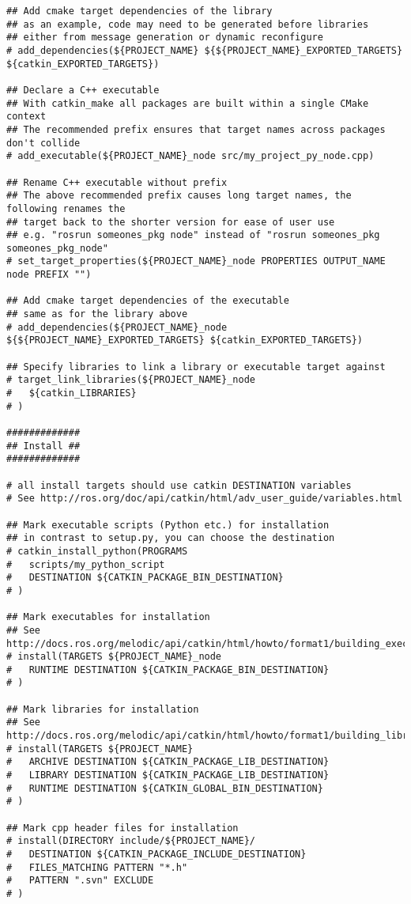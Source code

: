 \documentclass[letterpaper]{article}
\begin{document}
\begin{lstlisting}[style=mystyle, title=src/my\_project\_py/CMakeLists.txt]
## Add cmake target dependencies of the library
## as an example, code may need to be generated before libraries
## either from message generation or dynamic reconfigure
# add_dependencies(${PROJECT_NAME} ${${PROJECT_NAME}_EXPORTED_TARGETS} ${catkin_EXPORTED_TARGETS})

## Declare a C++ executable
## With catkin_make all packages are built within a single CMake context
## The recommended prefix ensures that target names across packages don't collide
# add_executable(${PROJECT_NAME}_node src/my_project_py_node.cpp)

## Rename C++ executable without prefix
## The above recommended prefix causes long target names, the following renames the
## target back to the shorter version for ease of user use
## e.g. "rosrun someones_pkg node" instead of "rosrun someones_pkg someones_pkg_node"
# set_target_properties(${PROJECT_NAME}_node PROPERTIES OUTPUT_NAME node PREFIX "")

## Add cmake target dependencies of the executable
## same as for the library above
# add_dependencies(${PROJECT_NAME}_node ${${PROJECT_NAME}_EXPORTED_TARGETS} ${catkin_EXPORTED_TARGETS})

## Specify libraries to link a library or executable target against
# target_link_libraries(${PROJECT_NAME}_node
#   ${catkin_LIBRARIES}
# )

#############
## Install ##
#############

# all install targets should use catkin DESTINATION variables
# See http://ros.org/doc/api/catkin/html/adv_user_guide/variables.html

## Mark executable scripts (Python etc.) for installation
## in contrast to setup.py, you can choose the destination
# catkin_install_python(PROGRAMS
#   scripts/my_python_script
#   DESTINATION ${CATKIN_PACKAGE_BIN_DESTINATION}
# )

## Mark executables for installation
## See http://docs.ros.org/melodic/api/catkin/html/howto/format1/building_executables.html
# install(TARGETS ${PROJECT_NAME}_node
#   RUNTIME DESTINATION ${CATKIN_PACKAGE_BIN_DESTINATION}
# )

## Mark libraries for installation
## See http://docs.ros.org/melodic/api/catkin/html/howto/format1/building_libraries.html
# install(TARGETS ${PROJECT_NAME}
#   ARCHIVE DESTINATION ${CATKIN_PACKAGE_LIB_DESTINATION}
#   LIBRARY DESTINATION ${CATKIN_PACKAGE_LIB_DESTINATION}
#   RUNTIME DESTINATION ${CATKIN_GLOBAL_BIN_DESTINATION}
# )

## Mark cpp header files for installation
# install(DIRECTORY include/${PROJECT_NAME}/
#   DESTINATION ${CATKIN_PACKAGE_INCLUDE_DESTINATION}
#   FILES_MATCHING PATTERN "*.h"
#   PATTERN ".svn" EXCLUDE
# )


\end{lstlisting}
\end{document}
